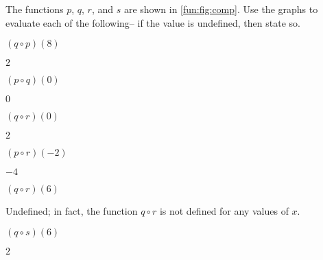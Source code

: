 \begin{exercises}
\begin{problem}
  The functions $p$, $q$, $r$, and $s$ are shown in \cref{fun:fig:comp}. Use the  
  graphs to evaluate each of the following-- if the value is undefined, then state 
  so.
  \begin{multicols}{3}
  \begin{subproblem}
	$(q\circ p)(8)$  
	\begin{shortsolution}
	$2$	
	\end{shortsolution}
  \end{subproblem}
  \begin{subproblem}
$(p\circ q)(0)$	  
	\begin{shortsolution}
	$0$	
	\end{shortsolution}
  \end{subproblem}
  \begin{subproblem}
	 $(q\circ r)(0)$ 
	\begin{shortsolution}
	$2$	
	\end{shortsolution}
  \end{subproblem}
  \begin{subproblem}
$(p\circ r)(-2)$	  
	\begin{shortsolution}
	$-4$	
	\end{shortsolution}
  \end{subproblem}
  \begin{subproblem}
$(q\circ r)(6)$	  
	\begin{shortsolution}
	Undefined; in fact, the function $q\circ r$ is not defined for any values of $x$.
	\end{shortsolution}
  \end{subproblem}
  \begin{subproblem}
$(q\circ s)(6)$	  
	\begin{shortsolution}
	$2$	
	\end{shortsolution}
  \end{subproblem}
  \end{multicols}
\end{problem}


\end{exercises}
